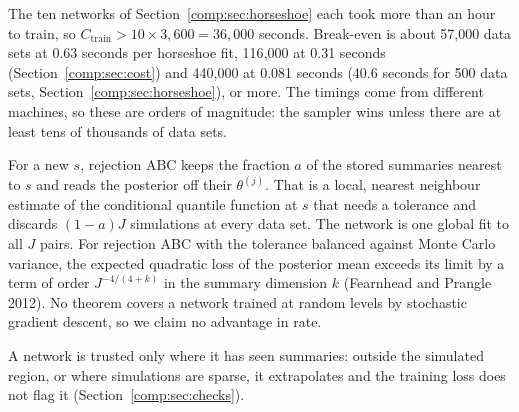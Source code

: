 The ten networks of Section~\ref{comp:sec:horseshoe} each took more than an hour to train, so $C_{\mathrm{train}}>10\times3{,}600=36{,}000$ seconds. Break-even is about 57{,}000 data sets at 0.63 seconds per horseshoe fit, 116{,}000 at 0.31 seconds (Section~\ref{comp:sec:cost}) and 440{,}000 at 0.081 seconds (40.6 seconds for 500 data sets, Section~\ref{comp:sec:horseshoe}), or more. The timings come from different machines, so these are orders of magnitude: the sampler wins unless there are at least tens of thousands of data sets.



For a new $s$, rejection ABC keeps the fraction $a$ of the stored summaries nearest to $s$ and reads the posterior off their $\theta^{(j)}$. That is a local, nearest neighbour estimate of the conditional quantile function at $s$ that needs a tolerance and discards $(1-a)J$ simulations at every data set. The network is one global fit to all $J$ pairs. For rejection ABC with the tolerance balanced against Monte Carlo variance, the expected quadratic loss of the posterior mean exceeds its limit by a term of order $J^{-4/(4+k)}$ in the summary dimension $k$ (Fearnhead and Prangle 2012).  No theorem covers a network trained at random levels by stochastic gradient descent, so we claim no advantage in rate.

A network is trusted only where it has seen summaries: outside the simulated region, or where simulations are sparse, it extrapolates and the training loss does not flag it (Section~\ref{comp:sec:checks}).


